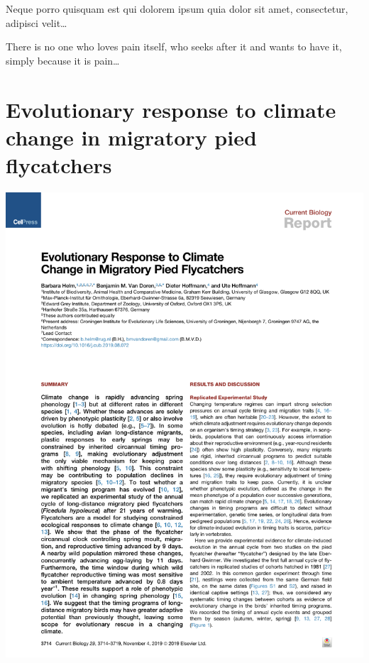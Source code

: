 \documentclass[a4paper, twoside]{templates/ociamthesis}
\begin{document}
\begin{savequote}
Neque porro quisquam est qui dolorem ipsum quia dolor sit amet,
consectetur, adipisci velit\ldots{}

There is no one who loves pain itself, who seeks after it and wants to
have it, simply because it is pain\ldots{}
\end{savequote}

\hypertarget{evolutionary-response}{%
\chapter{Evolutionary response to climate change in migratory pied flycatchers}\label{evolutionary-response}}

\minitoc 

\newpage

\begin{center}\includegraphics[width=1\linewidth]{pdf_chapters/pied/pied_crop_Part01} \end{center}
\end{document}
